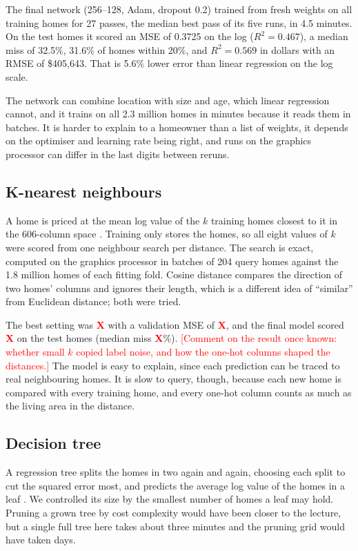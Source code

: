 \documentclass[sigconf,nonacm,10pt]{acmart}
\newcommand{\X}{\textcolor{red}{\textbf{X}}}
\newcommand{\pending}[1]{\textcolor{red}{[#1]}}
\begin{document}
The final network (256--128, Adam, dropout 0.2) trained from fresh weights on all training homes for 27 passes, the median best pass of its five runs, in 4.5 minutes. On the test homes it scored an MSE of 0.3725 on the log ($R^2 = 0.467$), a median miss of 32.5\%, 31.6\% of homes within 20\%, and $R^2 = 0.569$ in dollars with an RMSE of \$405,643. That is 5.6\% lower error than linear regression on the log scale.

The network can combine location with size and age, which linear regression cannot, and it trains on all 2.3 million homes in minutes because it reads them in batches. It is harder to explain to a homeowner than a list of weights, it depends on the optimiser and learning rate being right, and runs on the graphics processor can differ in the last digits between reruns.

\subsection{K-nearest neighbours}
A home is priced at the mean log value of the $k$ training homes closest to it in the 606-column space \cite{cover1967}. Training only stores the homes, so all eight values of $k$ were scored from one neighbour search per distance. The search is exact, computed on the graphics processor in batches of 204 query homes against the 1.8 million homes of each fitting fold. Cosine distance compares the direction of two homes' columns and ignores their length, which is a different idea of ``similar'' from Euclidean distance; both were tried.

The best setting was \X{} with a validation MSE of \X, and the final model scored \X{} on the test homes (median miss \X\%). \pending{Comment on the result once known: whether small $k$ copied label noise, and how the one-hot columns shaped the distances.} The model is easy to explain, since each prediction can be traced to real neighbouring homes. It is slow to query, though, because each new home is compared with every training home, and every one-hot column counts as much as the living area in the distance.

\subsection{Decision tree}
A regression tree splits the homes in two again and again, choosing each split to cut the squared error most, and predicts the average log value of the homes in a leaf \cite{breiman1984}. We controlled its size by the smallest number of homes a leaf may hold. Pruning a grown tree by cost complexity would have been closer to the lecture, but a single full tree here takes about three minutes and the pruning grid would have taken days.
\end{document}
